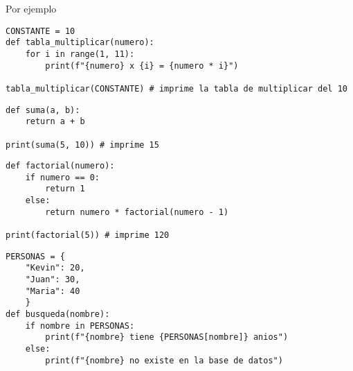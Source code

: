 \documentclass[executivepaper]{article}
\begin{document}
Por ejemplo
\begin{lstlisting}
CONSTANTE = 10
def tabla_multiplicar(numero):
    for i in range(1, 11):
        print(f"{numero} x {i} = {numero * i}")

tabla_multiplicar(CONSTANTE) # imprime la tabla de multiplicar del 10
\end{lstlisting}

\begin{lstlisting}
def suma(a, b):
    return a + b

print(suma(5, 10)) # imprime 15
\end{lstlisting}

\begin{lstlisting}
def factorial(numero):
    if numero == 0:
        return 1
    else:
        return numero * factorial(numero - 1)

print(factorial(5)) # imprime 120
\end{lstlisting}

\begin{lstlisting}
PERSONAS = {
    "Kevin": 20,
    "Juan": 30,
    "Maria": 40
    }
def busqueda(nombre):
    if nombre in PERSONAS:
        print(f"{nombre} tiene {PERSONAS[nombre]} anios")
    else:
        print(f"{nombre} no existe en la base de datos")
\end{lstlisting}
\end{document}
